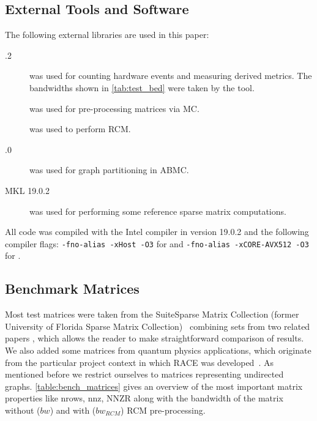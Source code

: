 \subsection{External Tools and Software}
The following external libraries are used in this paper:
\begin{description}
	\item[.2] \cite{LIKWID}  \likwidPerfctr was used for counting hardware events and measuring derived metrics. The bandwidths shown in \cref{tab:test_bed} were taken by the  \likwidBench tool.
	\item[\COLPACK] \cite{COLPACK} was used for pre-processing matrices via \acrshort{MC}.
	\item[\SPMP] \cite{SpMP} was used to perform \acrshort{RCM}.
	\item[.0] \cite{METIS} was used for graph partitioning in \acrshort{ABMC}.
	\item[\acrshort{MKL} 19.0.2] \cite{MKL} was used for performing some reference sparse matrix computations.
\end{description}
All code was compiled with the Intel compiler in version 19.0.2 and the following compiler flags: {\tt -fno-alias -xHost -O3} for \IVB and {\tt -fno-alias -xCORE-AVX512 -O3} for \SKX.

\subsection{Benchmark Matrices}
\label{subsec:bench_mat}
Most test matrices were taken from the Suite\-Sparse Matrix Collection (former University of Florida Sparse Matrix Collection)~\cite{UOF} combining sets from two related papers \cite{RSB,park_ls}, which allows the reader to make straightforward comparison of results.  We also added some matrices from quantum physics applications, which originate from the particular project context in which RACE was developed~\cite{ESSEX}. 
As mentioned before we restrict ourselves to matrices representing undirected graphs.
\cref{table:bench_matrices} gives an overview of the most important matrix properties like \acrfull{nrows}, \acrfull{nnz}, \acrfull{NNZR} along with the bandwidth of the matrix without ($bw$) and with ($bw_{RCM}$) \acrshort{RCM} pre-processing. 


